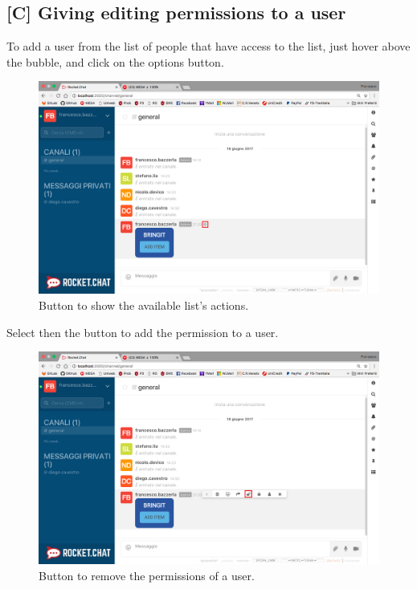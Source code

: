 \newpage
\subsection{[C] Giving editing permissions to a user}
To add a user from the list of people that have access to the list, just hover above the bubble, and click on the options button.

\begin{figure}[H]
  \centering 
  \includegraphics[width=\textwidth]{Sections/3-HowToUse/Images/bubble_options_button.png}
  \caption{Button to show the available list's actions.}
\end{figure}

Select then the button to add the permission to a user.

\begin{figure}[H]
  \centering 
  \includegraphics[width=\textwidth]{Sections/3-HowToUse/Images/bubble_option_permission_give.png}
  \caption{Button to remove the permissions of a user.}
\end{figure}

